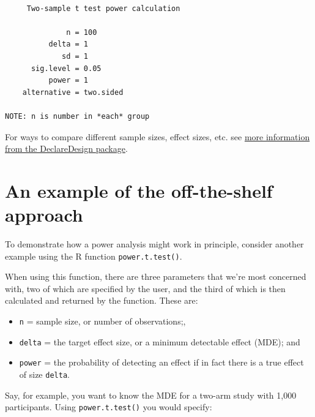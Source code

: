 \documentclass[
  12pt,
]{book}
\newenvironment{Shaded}{\begin{snugshade}}{\end{snugshade}}
\newcommand{\CommentTok}[1]{\textcolor[rgb]{0.56,0.35,0.01}{\textit{#1}}}
\newcommand{\DataTypeTok}[1]{\textcolor[rgb]{0.13,0.29,0.53}{#1}}
\newcommand{\DecValTok}[1]{\textcolor[rgb]{0.00,0.00,0.81}{#1}}
\newcommand{\FloatTok}[1]{\textcolor[rgb]{0.00,0.00,0.81}{#1}}
\newcommand{\KeywordTok}[1]{\textcolor[rgb]{0.13,0.29,0.53}{\textbf{#1}}}
\newcommand{\NormalTok}[1]{#1}
\providecommand{\tightlist}{%
  \setlength{\itemsep}{0pt}\setlength{\parskip}{0pt}}
\theoremstyle{definition}
\theoremstyle{definition}
\theoremstyle{definition}
\theoremstyle{remark}
\begin{document}
\begin{verbatim}

     Two-sample t test power calculation 

              n = 100
          delta = 1
             sd = 1
      sig.level = 0.05
          power = 1
    alternative = two.sided

NOTE: n is number in *each* group
\end{verbatim}

For ways to compare different sample sizes, effect sizes, etc. see
\href{https://declaredesign.org/blog/2018-10-02-power-strategies.html}{more
information from the DeclareDesign package}.

\hypertarget{an-example-of-the-off-the-shelf-approach}{%
\section{An example of the off-the-shelf
approach}\label{an-example-of-the-off-the-shelf-approach}}

To demonstrate how a power analysis might work in principle, consider
another example using the R function \texttt{power.t.test()}.

When using this function, there are three parameters that we're most
concerned with, two of which are specified by the user, and the third of
which is then calculated and returned by the function. These are:

\begin{itemize}
\tightlist
\item
  \texttt{n} = sample size, or number of observations;,
\item
  \texttt{delta} = the target effect size, or a minimum detectable
  effect (MDE); and
\item
  \texttt{power} = the probability of detecting an effect if in fact
  there is a true effect of size \texttt{delta}.
\end{itemize}

Say, for example, you want to know the MDE for a two-arm study with
1,000 participants. Using \texttt{power.t.test()} you would specify:

\begin{Shaded}
\end{Shaded}
\end{document}
